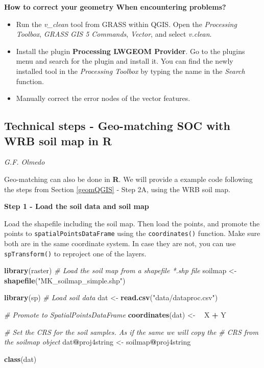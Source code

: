 \documentclass[10pt,b5paper,]{book}
\newenvironment{Shaded}{\begin{snugshade}}{\end{snugshade}}
\newcommand{\CommentTok}[1]{\textcolor[rgb]{0.56,0.35,0.01}{\textit{#1}}}
\newcommand{\ErrorTok}[1]{\textcolor[rgb]{0.64,0.00,0.00}{\textbf{#1}}}
\newcommand{\KeywordTok}[1]{\textcolor[rgb]{0.13,0.29,0.53}{\textbf{#1}}}
\newcommand{\NormalTok}[1]{#1}
\newcommand{\OperatorTok}[1]{\textcolor[rgb]{0.81,0.36,0.00}{\textbf{#1}}}
\newcommand{\StringTok}[1]{\textcolor[rgb]{0.31,0.60,0.02}{#1}}
\providecommand{\tightlist}{%
  \setlength{\itemsep}{0pt}\setlength{\parskip}{0pt}}
\theoremstyle{definition}
\theoremstyle{definition}
\theoremstyle{definition}
\theoremstyle{remark}
\begin{document}
\textbf{How to correct your geometry When encountering problems?}

\begin{itemize}
\tightlist
\item
  Run the \emph{v\_clean} tool from GRASS within QGIS. Open the
  \emph{Processing Toolbox}, \emph{GRASS GIS 5 Commands}, \emph{Vector},
  and select \emph{v.clean}.
\item
  Install the plugin \textbf{Processing LWGEOM Provider}. Go to the
  plugins menu and search for the plugin and install it. You can find
  the newly installed tool in the \emph{Processing Toolbox} by typing
  the name in the \emph{Search} function.
\item
  Manually correct the error nodes of the vector features.
\end{itemize}

\hypertarget{technical-steps---geo-matching-soc-with-wrb-soil-map-in-r}{%
\subsection{Technical steps - Geo-matching SOC with WRB soil map in
R}\label{technical-steps---geo-matching-soc-with-wrb-soil-map-in-r}}

\emph{G.F. Olmedo}

Geo-matching can also be done in \textbf{R}. We will provide a example
code following the steps from Section \ref{geomQGIS} - Step 2A, using
the WRB soil map.

\textbf{Step 1 - Load the soil data and soil map}

Load the shapefile including the soil map. Then load the points, and
promote the points to \texttt{spatialPointsDataFrame} using the
\texttt{coordinates()} function. Make sure both are in the same
coordinate system. In case they are not, you can use
\texttt{spTransform()} to reproject one of the layers.

\begin{Shaded}
\begin{Highlighting}[]
\KeywordTok{library}\NormalTok{(raster)}
\CommentTok{# Load the soil map from a shapefile *.shp file}
\NormalTok{soilmap <-}\StringTok{ }\KeywordTok{shapefile}\NormalTok{(}\StringTok{"MK_soilmap_simple.shp"}\NormalTok{)}

\KeywordTok{library}\NormalTok{(sp)}
\CommentTok{# Load soil data}
\NormalTok{dat <-}\StringTok{ }\KeywordTok{read.csv}\NormalTok{(}\StringTok{"data/dataproc.csv"}\NormalTok{)}

\CommentTok{# Promote to SpatialPointsDataFrame}
\KeywordTok{coordinates}\NormalTok{(dat) <-}\StringTok{ }\ErrorTok{~}\StringTok{ }\NormalTok{X }\OperatorTok{+}\StringTok{ }\NormalTok{Y}

\CommentTok{# Set the CRS for the soil samples. As if the same we will copy the }
\CommentTok{# CRS from the soilmap object}
\NormalTok{dat}\OperatorTok{@}\NormalTok{proj4string <-}\StringTok{ }\NormalTok{soilmap}\OperatorTok{@}\NormalTok{proj4string}

\KeywordTok{class}\NormalTok{(dat)}
\end{Highlighting}
\end{Shaded}
\end{document}
